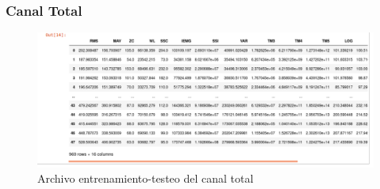         
        \newpage
        \subsubsection{Canal Total}
        \begin{figure}[ht]
            \centering
            \includegraphics[scale=0.4]{imagenes/datos canal total.png}
            \caption{Archivo entrenamiento-testeo del canal total}
            \label{fig:archivototal}
        \end{figure}
    
    
